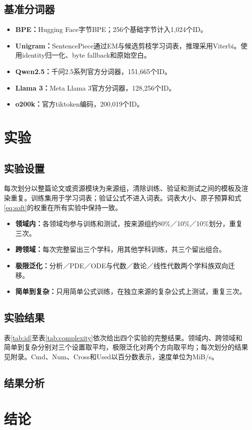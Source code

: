 \subsection{基准分词器}
\begin{itemize}
\item \textbf{BPE：}Hugging Face字节BPE；256个基础字节计入1,024个ID。
\item \textbf{Unigram：}SentencePiece通过EM与候选剪枝学习词表，推理采用Viterbi。使用identity归一化、byte fallback和原始空白。
\item \textbf{Qwen2.5：}千问2.5系列官方分词器，151,665个ID。
\item \textbf{Llama 3：}Meta Llama 3官方分词器，128,256个ID。
\item \textbf{o200k：}官方tiktoken编码，200,019个ID。
\end{itemize}


\section{实验}
\subsection{实验设置}
每次划分以整篇论文或资源模块为来源组，清除训练、验证和测试之间的模板及渲染重复。训练集用于学习词表；验证公式不进入词表。词表大小、原子预算和式\eqref{eq:soft}的权重在所有实验中保持一致。
\begin{itemize}
\item \textbf{领域内：}各领域均参与训练和测试，按来源组约80\%／10\%／10\%划分，重复三次。
\item \textbf{跨领域：}每次完整留出三个学科，用其他学科训练，共三个留出组合。
\item \textbf{极限泛化：}分析／PDE／ODE与代数／数论／线性代数两个学科族双向迁移。
\item \textbf{简单到复杂：}只用简单公式训练，在独立来源的复杂公式上测试，重复三次。
\end{itemize}


\subsection{实验结果}
表\ref{tab:id}至表\ref{tab:complexity}依次给出四个实验的完整结果。领域内、跨领域和简单到复杂分别对三个设置取平均，极限泛化对两个方向取平均；每次划分的结果见附录。Cmd、Num、Cross和Used以百分数表示，速度单位为MiB/s。

\FloatBarrier
\subsection{结果分析}


\section{结论}

